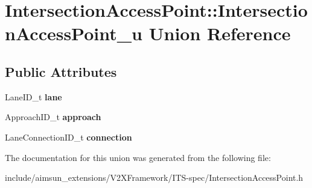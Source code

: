 \hypertarget{unionIntersectionAccessPoint_1_1IntersectionAccessPoint__u}{}\section{Intersection\+Access\+Point\+:\+:Intersection\+Access\+Point\+\_\+u Union Reference}
\label{unionIntersectionAccessPoint_1_1IntersectionAccessPoint__u}
\subsection*{Public Attributes}
\begin{DoxyCompactItemize}
\item 
Lane\+I\+D\+\_\+t {\bfseries lane}\hypertarget{unionIntersectionAccessPoint_1_1IntersectionAccessPoint__u_a251dbc94676597168c0dfc6f4706894d}{}\label{unionIntersectionAccessPoint_1_1IntersectionAccessPoint__u_a251dbc94676597168c0dfc6f4706894d}

\item 
Approach\+I\+D\+\_\+t {\bfseries approach}\hypertarget{unionIntersectionAccessPoint_1_1IntersectionAccessPoint__u_a7ace9df7671b55a476bedd7855980f71}{}\label{unionIntersectionAccessPoint_1_1IntersectionAccessPoint__u_a7ace9df7671b55a476bedd7855980f71}

\item 
Lane\+Connection\+I\+D\+\_\+t {\bfseries connection}\hypertarget{unionIntersectionAccessPoint_1_1IntersectionAccessPoint__u_a8cf872cdc5576281f19cd48b24934ac6}{}\label{unionIntersectionAccessPoint_1_1IntersectionAccessPoint__u_a8cf872cdc5576281f19cd48b24934ac6}

\end{DoxyCompactItemize}


The documentation for this union was generated from the following file\+:\begin{DoxyCompactItemize}
\item 
include/aimsun\+\_\+extensions/\+V2\+X\+Framework/\+I\+T\+S-\/spec/Intersection\+Access\+Point.\+h\end{DoxyCompactItemize}
